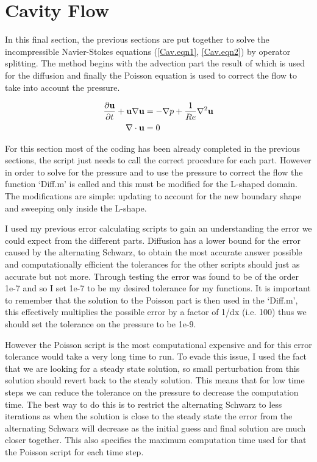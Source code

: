 \documentclass[11pt,a4paper,notitlepage]{article}
\begin{document}
\newpage
\section{Cavity Flow}

In this final section, the previous sections are put together to solve the incompressible Navier-Stokes equations (\ref{Cav.eqn1}, \ref{Cav.eqn2}) by operator splitting. The method begins with the advection part the result of which is used for the diffusion and finally the Poisson equation is used to correct the flow to take into account the pressure.

\begin{align} \label{Cav.eqn1}
\frac{\partial \bf{u}}{\partial t} + \bf{u} \nabla \bf{u} &= -\nabla p + \frac{1}{Re} \nabla^2\bf{u}\\ \label{Cav.eqn2}
\nabla \cdot \bf{u} &= 0
\end{align}

For this section most of the coding has been already completed in the previous sections, the script just needs to call the correct procedure for each part. However in order to solve for the pressure and to use the pressure to correct the flow the function `Diff.m' is called and this must be modified for the L-shaped domain. The modifications are simple: updating to account for the new boundary shape and sweeping only inside the L-shape.

I used my previous error calculating scripts to gain an understanding the error we could expect from the different parts. Diffusion has a lower bound for the error caused by the alternating Schwarz, to obtain the most accurate answer possible and computationally efficient the tolerances for the other scripts should just as accurate but not more. Through testing the error was found to be of the order 1e-7 and so I set 1e-7 to be my desired tolerance for my functions.  It is important to remember that the solution to the Poisson part is then used in the `Diff.m', this effectively multiplies the possible error by a factor of 1/dx (i.e. 100) thus we should set the tolerance on the pressure to be 1e-9.

However the Poisson script is the most computational expensive and for this error tolerance would take a very long time to run. To evade this issue, I used the fact that we are looking for a steady state solution, so small perturbation from this solution should revert back to the steady solution. This means that for low time steps we can reduce the tolerance on the pressure to decrease the computation time. The best way to do this is to restrict the alternating Schwarz to less iterations as when the solution is close to the steady state the error from the alternating Schwarz will decrease as the initial guess and final solution are much closer together. This also specifies the maximum computation time used for that the Poisson script for each time step.
\end{document}
